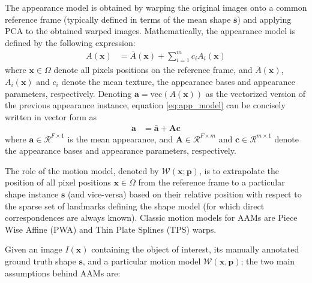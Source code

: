 The appearance model is obtained by warping the original images onto a common reference frame (typically defined in terms of the mean shape $\mathbf{\bar{s}}$) and applying PCA to the obtained warped images. Mathematically, the appearance model is defined by the following expression:
\begin{equation}
	\begin{aligned}
		A(\mathbf{x}) & = \bar{A}(\mathbf{x}) + \sum_{i=1}^m c_i A_i(\mathbf{x})
	\end{aligned}
    \label{eq:app_model}
\end{equation}
where $\mathbf{x} \in \Omega$ denote all pixels positions on the reference frame, and $\bar{A}(\mathbf{x})$, $A_i(\mathbf{x})$ and $c_i$ denote the mean texture, the appearance bases and appearance parameters, respectively. Denoting $\mathbf{a} = \text{vec}(A(\mathbf{x}))$ as the vectorized version of the previous appearance instance, equation \ref{eq:app_model} can be concisely written in vector form as
\begin{equation}
	\begin{aligned}
		\mathbf{a} & = \mathbf{\bar{a}} + \mathbf{A} \mathbf{c}
	\end{aligned}
    \label{eq:app_model_vec}
\end{equation}
where $\mathbf{a} \in \mathcal{R}^{F \times 1}$ is the mean appearance, and $\mathbf{A} \in  \mathcal{R}^{F \times  m}$ and $\mathbf{c} \in \mathcal{R}^{m \times 1}$ denote the appearance bases and appearance parameters, respectively.

The role of the motion model, denoted by $\mathcal{W}(\mathbf{x}; \mathbf{p})$, is to extrapolate the position of all pixel positions $\mathbf{x} \in \Omega$ from the reference frame to a particular shape instance $\mathbf{s}$ (and vice-versa) based on their relative position with respect to the sparse set of landmarks defining the shape model (for which direct correspondences are always known). Classic motion models for AAMs are Piece Wise Affine (PWA) \cite{Cootes2004,Matthews2004} and Thin Plate Splines (TPS) \cite{Cootes2004,Papandreou2008} warps. 

Given an image $I(\mathbf{x})$ containing the object of interest, its manually annotated ground truth shape $\mathbf{s}$, and a particular motion model $\mathcal{W}(\mathbf{x}, \mathbf{p})$; the two main assumptions behind AAMs are:

